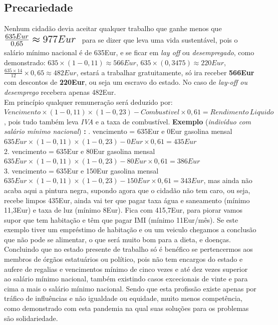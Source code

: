 \subsection{Precariedade}
\qquad Nenhum cidadão devia aceitar qualquer trabalho que ganhe menos que \; $ \mbox{\Large $ \frac{635Eur}{0,65}\approx 977Eur $ } $ para se dizer que leva uma vida sustentável, pois o salário mínimo nacional é de 635Eur, e se ficar em \textit{lay off} ou \textit{desempregado}, como demonstrado:
\emptyline
\hspace*{.3cm} $635\times(1-0,11)\approx566Eur$,\hspace*{1cm} $635\times(0,3475)\approx220Eur$,\hspace*{1cm} $\frac{635\times14}{12}\times0,65 \approx 482Eur$,
\emptyline
estará a trabalhar gratuitamente, só ira receber \textbf{566Eur} com descontos de \textbf{220Eur}, ou seja um escravo do estado. No caso de \textit{lay-off ou desemprego} recebera apenas 482Eur.\\
Em princípio qualquer remuneração será deduzido por: $Vencimento \times (1-0,11) \times (1-0,23) - Combustivel\times 0,61 = Rendimento \, Liquido$, pois tudo também leva \textit{IVA} e a taxa de combustível.
\emptyline
\textbf{Exemplo} (\textit{indivíduo com salário mínimo nacional}) \; \textbf{:}
. vencimento = 635Eur e 0Eur gasolina mensal \\
\hspace*{1cm} $635Eur \times (1-0,11) \times (1-0,23) - 0Eur \times 0,61 = 435Eur$ \\
2. vencimento = 635Eur e 80Eur gasolina mensal \\
\hspace*{1cm} $635Eur \times (1-0,11) \times (1-0,23) - 80Eur \times 0,61 = 386Eur$ \\
3. vencimento = 635Eur e 150Eur gasolina mensal \\
\hspace*{1cm} $635Eur \times (1-0,11) \times (1-0,23) - 150Eur \times 0,61 = 343Eur$,
\emptyline
mas ainda não acaba aqui a pintura negra, supondo agora que o cidadão não tem caro, ou seja, recebe limpos 435Eur, ainda vai ter que pagar taxa água e saneamento (mínimo 11,3Eur) e taxa de luz (mínimo 8Eur). Fica com 415,7Eur, para piorar vamos supor que tem habitação e têm que pagar IMI (mínimo 11Eur/mês).
Se este exemplo tiver um empréstimo de habitação e ou um veiculo chegamos a conclusão que não pode se alimentar, o que será muito bom para a dieta, e doenças.
\emptyline
Concluindo que no estado presente de trabalho só é benéfico se pertencermos aos membros de órgãos estatuários ou político, pois não tem encargos do estado e aufere de regalias e vencimentos mínimo de cinco vezes e até dez vezes superior ao salário mínimo nacional, também existindo casos excecionais de vinte e para cima a mais o salário mínimo nacional. Sendo que esta profissão existe apenas por tráfico de influências e não igualdade ou equidade, muito menos competência, como demonstrado com esta pandemia na qual suas soluções para os problemas são solidariedade.
